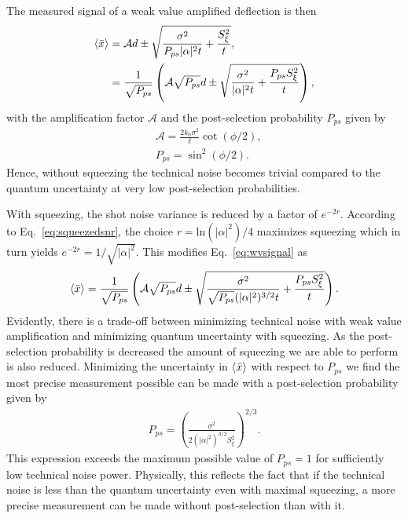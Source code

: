 The measured signal of a weak value amplified deflection is then 
\begin{align}\label{eq:wvsignal}
\nonumber\left\langle \bar{x} \right\rangle &=  \mathcal{A}d \pm \sqrt{\frac{\sigma^2}{P_{ps}|\alpha|^2 t} + \frac{S_\xi^2}{t}},\\
&=\frac{1}{\sqrt{P_{ps}}}\left(\mathcal{A}\sqrt{P_{ps}}d \pm \sqrt{\frac{\sigma^2}{|\alpha|^2 t} + \frac{P_{ps}S_\xi^2}{t}}\right),
\end{align}
with the amplification factor $\mathcal{A}$ and the post-selection probability $P_{ps}$ given by
\begin{align}
&\nonumber \mathcal{A} = \frac{2k_0 \sigma^2}{\ell}\cot (\phi/2),\\
&P_{ps} = \sin^2 (\phi/2).
\end{align}
Hence, without squeezing the technical noise becomes trivial compared to the quantum uncertainty at very low post-selection probabilities.  

With squeezing, the shot noise variance is reduced by a factor of $e^{-2r}$.  According to Eq.~\eqref{eq:squeezedsnr}, the choice $r = \text{ln}(|\alpha|^2)/4$ maximizes squeezing which in turn yields $e^{-2r} = 1/\sqrt{|\alpha|^2}$.  This modifies Eq.~\eqref{eq:wvsignal} as
\begin{align}
\left\langle \bar{x} \right\rangle = \frac{1}{\sqrt{P_{ps}}}\left(\mathcal{A}\sqrt{P_{ps}}d \pm \sqrt{\frac{\sigma^2}{\sqrt{P_{ps}}(|\alpha|^2)^{3/2} t} + \frac{P_{ps}S_\xi^2}{t}}\right).
\end{align}
Evidently, there is a trade-off between minimizing technical noise with weak value amplification and minimizing quantum uncertainty with squeezing.  As the post-selection probability is decreased the amount of squeezing we are able to perform is also reduced.  Minimizing the uncertainty in $\left\langle \bar{x} \right\rangle$ with respect to $P_{ps}$ we find the most precise measurement possible can be made with a post-selection probability given by 
\begin{align}
P_{ps} = \left(\frac{\sigma^2}{2(|\alpha|^2)^{3/2}S_\xi^2}\right)^{2/3}.
\end{align}
This expression exceeds the maximum possible value of $P_{ps} = 1$ for sufficiently low technical noise power.  Physically, this reflects the fact that if the technical noise is less than the quantum uncertainty even with maximal squeezing, a more precise measurement can be made without post-selection than with it.  


